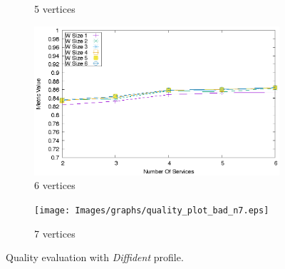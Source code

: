 \begin{figure}[ht]
\begin{subfigure}{0.33\textwidth}
    \caption{5 vertices}
    \label{fig:quality_window_bad_c}
  \end{subfigure}
  \hfill
  \begin{subfigure}{0.33\textwidth}
    \includegraphics[width=\textwidth]{Images/graphs/quality_plot_bad_n6.eps}
    \caption{6 vertices}
    \label{fig:quality_window_bad_d}
  \end{subfigure}
  \hspace{0.04\textwidth}
  \begin{subfigure}{0.33\textwidth}
    \texttt{[image: Images/graphs/quality\_plot\_bad\_n7.eps]}
    \caption{7 vertices}
    \label{fig:quality_window_bad_e}
  \end{subfigure}
  \hfill
  \caption{Quality evaluation with \textit{Diffident} profile.}
  \label{fig:quality_window_bad}
\end{figure}


